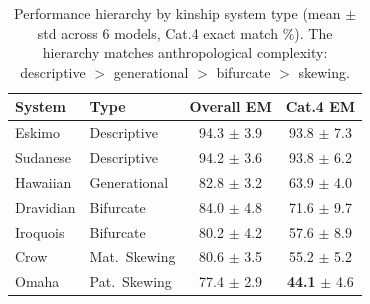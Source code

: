 \begin{table}[t]
\centering
\small
\caption{Performance hierarchy by kinship system type (mean $\pm$ std across 6 models, Cat.4 exact match \%). The hierarchy matches anthropological complexity: descriptive $>$ generational $>$ bifurcate $>$ skewing.}
\label{tab:system-hierarchy}
\begin{tabular}{llcc}
\toprule
\textbf{System} & \textbf{Type} & \textbf{Overall EM} & \textbf{Cat.4 EM} \\
\midrule
Eskimo    & Descriptive     & 94.3 $\pm$ 3.9 & 93.8 $\pm$ 7.3 \\
Sudanese  & Descriptive     & 94.2 $\pm$ 3.6 & 93.8 $\pm$ 6.2 \\
\midrule
Hawaiian  & Generational    & 82.8 $\pm$ 3.2 & 63.9 $\pm$ 4.0 \\
\midrule
Dravidian & Bifurcate       & 84.0 $\pm$ 4.8 & 71.6 $\pm$ 9.7 \\
Iroquois  & Bifurcate       & 80.2 $\pm$ 4.2 & 57.6 $\pm$ 8.9 \\
\midrule
Crow      & Mat.\ Skewing   & 80.6 $\pm$ 3.5 & 55.2 $\pm$ 5.2 \\
Omaha     & Pat.\ Skewing   & 77.4 $\pm$ 2.9 & \textbf{44.1} $\pm$ 4.6 \\
\bottomrule
\end{tabular}
\end{table}
